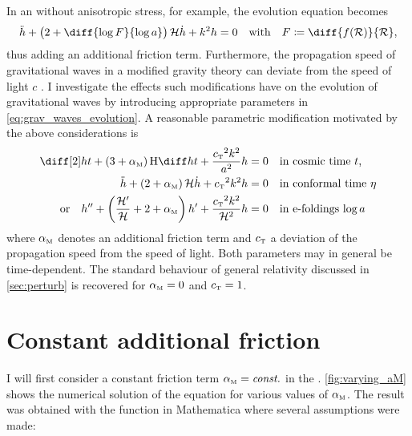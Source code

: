 \documentclass[parskip=half]{scrreprt}
\begin{document}
In an  without anisotropic stress, for example, the evolution equation becomes \citep{Xu2015,Hwang1996}
\begin{equation}
	\ddconf{h} + \del{2 + \diff{\log{F}}{\efold}} \Hconf \dconf{h} + k^2 h = 0 \quad \text{with} \quad F \defeq \diff{f(\Rscal)}{\Rscal} \eqpunct{,}
\end{equation}
thus adding an additional friction term. Furthermore, the propagation speed of gravitational waves in a modified gravity theory can deviate from the speed of light \(c\) \citep{Amendola2014,Raveri2014}. I investigate the effects such modifications have on the evolution of gravitational waves by introducing appropriate parameters in \eqref{eq:grav_waves_evolution}. A reasonable parametric modification motivated by the above considerations is
\begin{subequations}\label{eq:evolution_friction}
\begin{align}
	\ddt{h} + \del{3 + \alphaM} \Hcosm \dt{h} + \frac{\cT^2 k^2}{a^2} h &= 0 \quad \text{in cosmic time \(t\),} \\
	\ddconf{h} + \del{2 + \alphaM} \Hconf \dconf{h} + \cT^2 k^2 h &= 0 \quad \text{in conformal time \(\conft\)} \\
    \text{or} \quad \ddefold{h} + \del{\frac{\defold{\Hconf}}{\Hconf} + 2 + \alphaM} \defold{h} + \frac{\cT^2 k^2}{\Hconf^2} h &= 0 \quad \text{in e-foldings \(\efold\)}
\end{align}
\end{subequations}
where \({\alpha_{\textnormal{\tiny{M}}}}\) denotes an additional friction term and \({c_{\textnormal{\tiny{T}}}}\) a deviation of the propagation speed from the speed of light. Both parameters may in general be time-dependent. The standard behaviour of general relativity discussed in \autoref{sec:perturb} is recovered for \({\alpha_{\textnormal{\tiny{M}}}}=0\) and \({c_{\textnormal{\tiny{T}}}}=1\).


\section{Constant additional friction}\label{sec:param_friction_const}

I will first consider a constant friction term \({\alpha_{\textnormal{\tiny{M}}}}=\textnormal{\textit{const.}}\) in the . \autoref{fig:varying_aM} shows the numerical solution of the equation for various values of \({\alpha_{\textnormal{\tiny{M}}}}\). The result was obtained with the  function in Mathematica where several assumptions were made:
\end{document}
